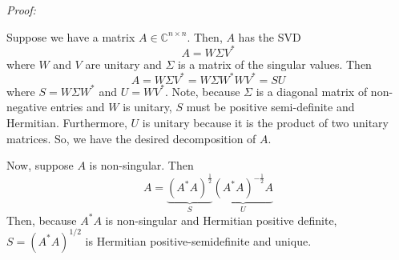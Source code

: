 \documentclass[a4paper,12pt]{article}
\newcommand{\comps}{\mathbb{C}}
\newenvironment{proof}[2][$\square$]
    {\setlength{\parskip}{0pt}\par\textit{Proof:} #2\setlength{\parskip}{0.25cm}
        \savebox{\qed}{#1}
        \begin{adjustwidth}{\widthof{Proof:}}{}
    }
    {
        \hfill\usebox{\qed}\end{adjustwidth}
    }
\begin{document}
\begin{enumerate}[label = (\arabic*)]
	\begin{proof}{}
		Suppose we have a matrix $ A \in \comps^{n \times n}  $. Then, $ A $ has the SVD 
		\[
			A = W \Sigma V^*
		\]
		where $ W $ and $ V $ are unitary and $ \Sigma $ is a matrix of the singular values. Then
		\[
			A = W \Sigma V^* = W \Sigma W^* W V^* = S U
		\]
		where $ S = W \Sigma W^* $ and $ U = W V^* $. Note, because $ \Sigma $ is a diagonal matrix of non-negative entries and $ W $ is unitary, $ S $ must be positive semi-definite and Hermitian. Furthermore, $ U $ is unitary because it is the product of two unitary matrices. So, we have the desired decomposition of $ A $.
		
		Now, suppose $ A $ is non-singular. Then
		\[
			A = \underbrace{(A^* A)^{\frac{1}{2}}}_S \underbrace{(A^* A)^{-\frac{1}{2}} A}_U
		\]
		Then, because $ A^* A $ is non-singular and Hermitian positive definite, $ S = (A^* A)^{1/2} $ is Hermitian positive-semidefinite and unique.
	\end{proof}
\end{enumerate}
\end{document}
